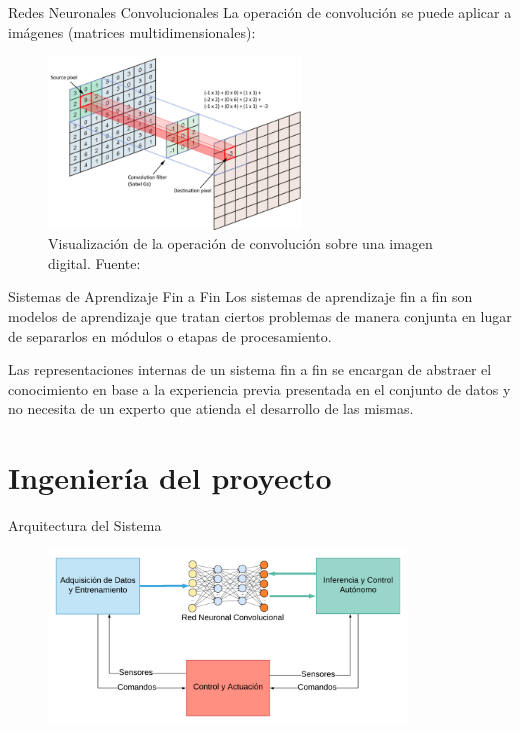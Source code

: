 \documentclass[10pt]{beamer}
\begin{document}
\begin{frame}{Redes Neuronales Convolucionales}
    La operación de convolución se puede aplicar a imágenes (matrices multidimensionales):

    \begin{figure}[!h] 
        \centering
        \includegraphics[width=0.60\textwidth]{../img/convolucion}
        \caption[Visualización de la operación de convolución sobre una imagen digital]{Visualización de la operación de convolución sobre una imagen digital. Fuente: \cite{cornelisse_2018} }
    \end{figure}
\end{frame}

\begin{frame}{Sistemas de Aprendizaje Fin a Fin}
    Los sistemas de aprendizaje fin a fin son modelos de aprendizaje que tratan ciertos problemas 
    \alert{de manera conjunta} en lugar de separarlos en módulos o etapas de procesamiento.

    Las representaciones internas de un sistema fin a fin se encargan de abstraer el conocimiento en 
    base a la experiencia previa presentada en el conjunto de datos y no necesita de un experto que atienda 
    el desarrollo de las mismas.

\end{frame}

\section*{Ingeniería del proyecto}

\begin{frame}{Arquitectura del Sistema}
    \begin{figure}[!h] 
        \centering
        \includegraphics[width=0.85\textwidth]{../img/arquitectura}
        \end{figure}
\end{frame}
\end{document}
